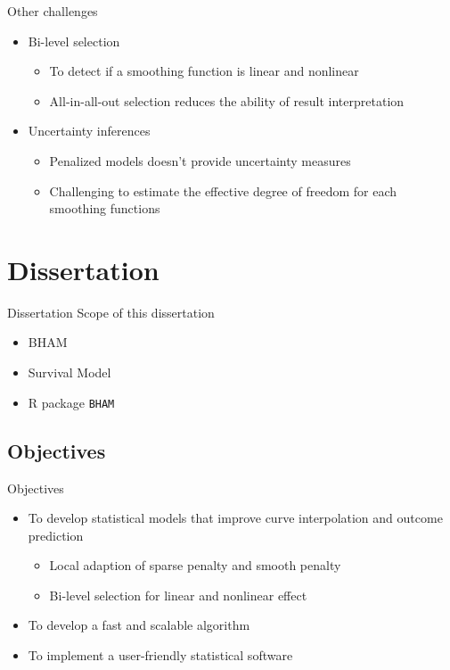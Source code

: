 \documentclass[
  ignorenonframetext,
  aspectratio=169]{beamer}
\providecommand{\tightlist}{%
  \setlength{\itemsep}{0pt}\setlength{\parskip}{0pt}}
\begin{document}
\begin{frame}{Other challenges}
\protect\hypertarget{other-challenges}{}
\begin{itemize}
\tightlist
\item
  Bi-level selection

  \begin{itemize}
  \tightlist
  \item
    To detect if a smoothing function is linear and nonlinear
  \item
    All-in-all-out selection reduces the ability of result
    interpretation
  \end{itemize}
\item
  Uncertainty inferences

  \begin{itemize}
  \tightlist
  \item
    Penalized models doesn't provide uncertainty measures
  \item
    Challenging to estimate the effective degree of freedom for each
    smoothing functions
  \end{itemize}
\end{itemize}
\end{frame}

\hypertarget{dissertation}{%
\section{Dissertation}\label{dissertation}}

\begin{frame}[fragile]{Dissertation}
Scope of this dissertation

\begin{itemize}
\tightlist
\item
  BHAM
\item
  Survival Model
\item
  R package \texttt{BHAM}
\end{itemize}
\end{frame}

\hypertarget{objectives}{%
\subsection{Objectives}\label{objectives}}

\begin{frame}{Objectives}
\begin{itemize}
\tightlist
\item
  To develop statistical models that improve curve interpolation and
  outcome prediction

  \begin{itemize}
  \tightlist
  \item
    Local adaption of sparse penalty and smooth penalty
  \item
    Bi-level selection for linear and nonlinear effect
  \end{itemize}
\item
  To develop a fast and scalable algorithm
\item
  To implement a user-friendly statistical software
\end{itemize}
\end{frame}
\end{document}
